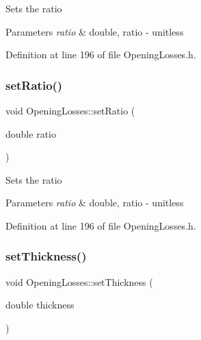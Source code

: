 Sets the ratio 
\begin{DoxyParams}{Parameters}
{\em ratio} & double, ratio -\/ unitless \\
\hline
\end{DoxyParams}


Definition at line 196 of file Opening\+Losses.\+h.

\mbox{\label{class_opening_losses_aab7f82f24511c37f0bc4b29cbc7239b5}} 
\subsubsection{\texorpdfstring{set\+Ratio()}{setRatio()}\hspace{0.1cm}{\footnotesize\ttfamily [3/3]}}
{\footnotesize\ttfamily void Opening\+Losses\+::set\+Ratio (\begin{DoxyParamCaption}\item[{double}]{ratio }\end{DoxyParamCaption})\hspace{0.3cm}{\ttfamily [inline]}}

Sets the ratio 
\begin{DoxyParams}{Parameters}
{\em ratio} & double, ratio -\/ unitless \\
\hline
\end{DoxyParams}


Definition at line 196 of file Opening\+Losses.\+h.

\mbox{\label{class_opening_losses_a221cc88072e4f0975f15c6cd96781dea}} 
\subsubsection{\texorpdfstring{set\+Thickness()}{setThickness()}\hspace{0.1cm}{\footnotesize\ttfamily [1/3]}}
{\footnotesize\ttfamily void Opening\+Losses\+::set\+Thickness (\begin{DoxyParamCaption}\item[{double}]{thickness }\end{DoxyParamCaption})\hspace{0.3cm}{\ttfamily [inline]}}

